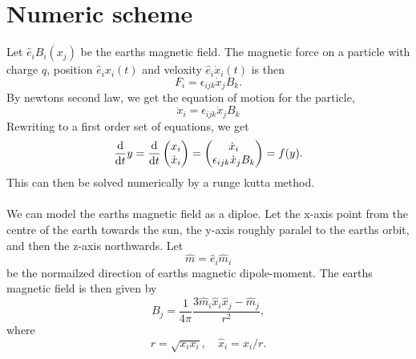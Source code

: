 \documentclass{article}
\begin{document}
    \section*{Numeric scheme}
    Let $ \hat e_i B_i(x_j)$ be the earths magnetic field. The magnetic force on a particle with charge $q$, position $\hat e_i x_i(t)$ and veloxity $\hat e_i \dot x_i (t)$ is then
    \begin{equation}
        F_i = \epsilon_{ijk} \dot x_j B_k.
    \end{equation}
    By newtons second law, we get the equation of motion for the particle,
    \begin{equation}
        \ddot x_i = \epsilon_{ijk} \dot x_j B_k
    \end{equation}
    Rewriting to a first order set of equations, we get
    \begin{align*}
        \dv{t} y = \dv{t} 
        \begin{pmatrix}
            x_i \\
            \dot x_i
        \end{pmatrix}
        = 
        \begin{pmatrix}
            \dot x_i \\
            \epsilon_{ijk} \dot x_j B_k
        \end{pmatrix}
         = f(y).
    \end{align*}
    This can then be solved numerically by a runge kutta method.

    \paragraph{}
    We can model the earths magnetic field as a diploe. Let the x-axis point from the centre of the earth towards the sun, the y-axis roughly paralel to the earths orbit, and then the z-axis northwards. Let
        \begin{equation*}
            \hat m = \hat e_i \hat m_i
        \end{equation*}
        be the normailzed direction of earths magnetic dipole-moment. The earths magnetic field is then given by
        \begin{equation}
            B_j = \frac{1}{4\pi} \frac{3\hat m_i \hat x_i \hat x_j - \hat m_j}{r^2},
        \end{equation}
        where
        \begin{equation*}
            r = \sqrt{x_ix_i}, \quad \hat x_i = x_i / r.
        \end{equation*}
\end{document}
